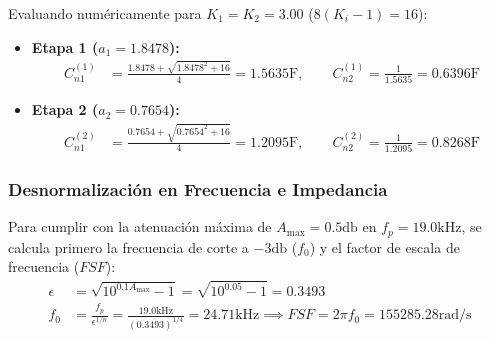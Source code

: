Evaluando numéricamente para $K_1 = K_2 = 3.00$ ($8(K_i - 1) = 16$):
\begin{itemize}
    \item \textbf{Etapa 1 ($a_1 = 1.8478$):}
        \begin{align*}
            C_{n1}^{(1)} &= \frac{1.8478 + \sqrt{1.8478^2 + 16}}{4} = 1.5635 \unit{\farad}, \qquad C_{n2}^{(1)} = \frac{1}{1.5635} = 0.6396 \unit{\farad}
        \end{align*}
    \item \textbf{Etapa 2 ($a_2 = 0.7654$):}
        \begin{align*}
            C_{n1}^{(2)} &= \frac{0.7654 + \sqrt{0.7654^2 + 16}}{4} = 1.2095 \unit{\farad}, \qquad C_{n2}^{(2)} = \frac{1}{1.2095} = 0.8268 \unit{\farad}
        \end{align*}
\end{itemize}

\subsubsection{Desnormalización en Frecuencia e Impedancia}
Para cumplir con la atenuación máxima de $A_{\max} = 0.5 \unit{\decibel}$ en $f_p = 19.0 \unit{\kilo\hertz}$, se
calcula primero la frecuencia de corte a $-3 \unit{\decibel}$ ($f_0$) y el factor de escala de frecuencia ($FSF$):
\begin{align*}
    \epsilon &= \sqrt{10^{0.1 A_{\max}} - 1} = \sqrt{10^{0.05} - 1} = 0.3493 \\
    f_0 &= \frac{f_p}{\epsilon^{1/n}} = \frac{19.0 \unit{\kilo\hertz}}{(0.3493)^{1/4}} = 24.71 \unit{\kilo\hertz} \implies FSF = 2\pi f_0 = 155285.28 \unit{\radian\per\second}
\end{align*}

